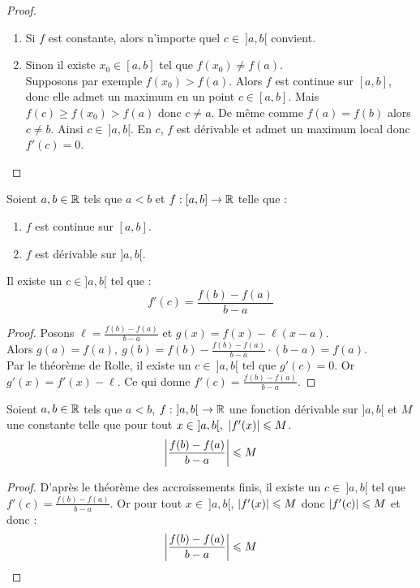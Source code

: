 \begin{proof}\cite{exo7_analyse1}
	\leavevmode
	\begin{enumerate}
		\item Si $f$ est constante, alors n'importe quel $c \in \ ]a, b[$ convient.
		\item Sinon il existe $x_0 \in [a, b]$ tel que $f(x_0) \neq f(a)$. 
		\\
		Supposons par exemple $f(x_0) > f(a)$. Alors $f$ est continue sur $[a, b]$, donc elle admet un maximum en un point $c \in [a, b]$. Mais $f(c) \geq f(x_0) > f(a)$ donc $c \neq a$. De même comme $f(a) = f(b)$ alors $c \neq b$. Ainsi $c \in \ ]a, b[$. En $c$, $f$ est dérivable et admet un maximum local donc $f'(c) = 0$.
	\end{enumerate}
\end{proof}

\begin{theorem}
    Soient $a, b \in \mathbb{R}$ tels que $a < b$ et $f : [a, b] \to \mathbb{R}$ telle que : 
    \begin{enumerate}
            \item $f$ est continue sur $[a, b]$.
            \item $f$ est dérivable sur $]a, b[$.
        \end{enumerate}
    \par \noindent Il existe un $c \in ]a, b[$ tel que :
	\[ f'(c) = \frac{f(b) - f(a)}{b - a} \]
\end{theorem}

\begin{proof}\cite{exo7_analyse1}
	Posons $\ell = \frac{f(b) - f(a)}{b - a}$ et $g(x) = f(x) - \ell (x - a)$.
	 \\
	 Alors $g(a) = f(a),\ g(b) = f(b) - \frac{f(b) - f(a)}{b - a} \cdot (b - a) = f(a)$.
	 \\
	  Par le théorème de Rolle, il existe un $c \in \ ]a, b[$ tel que $g'(c) = 0$. Or $g'(x) = f'(x) - \ell$. Ce qui donne $f'(c) = \frac{f(b) - f(a)}{b - a}$.
\end{proof}

\begin{corollary}
	Soient $a,b \in \mathbb{R}$ tels que $a < b$, $f : \ ]a, b[ \ \to \mathbb{R}$ une fonction dérivable sur $]a, b[$ et $M$ une constante telle que pour tout $x \in \ ]a, b[,\ \abs{f'(x)} \leqslant M$.
	\[ \abs{\frac{f(b) - f(a)}{b - a}} \leqslant M \]
\end{corollary}

\begin{proof}
	D'après le théorème des accroissements finis, il existe un $c \in \ ]a, b[$ tel que $f'(c) = \frac{f(b) - f(a)}{b - a}$. Or pour tout $x \in \ ]a, b[$, $\abs{f'(x)} \leqslant M$ donc $\abs{f'(c)} \leqslant M$ et donc :
	\[ \abs{\frac{f(b) - f(a)}{b - a}} \leqslant M \]
\end{proof}

